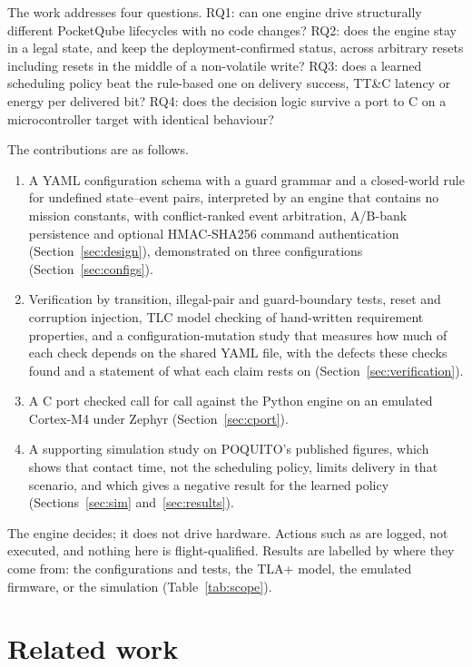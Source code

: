 \documentclass[preprint,12pt]{elsarticle}
\newcommand{\ttc}{TT\&C}
\begin{document}
The work addresses four questions. RQ1: can one engine drive structurally different PocketQube lifecycles with no code changes? RQ2: does the engine stay in a legal state, and keep the deployment-confirmed status, across arbitrary resets including resets in the middle of a non-volatile write? RQ3: does a learned scheduling policy beat the rule-based one on delivery success, \ttc{} latency or energy per delivered bit? RQ4: does the decision logic survive a port to C on a microcontroller target with identical behaviour?

The contributions are as follows.
\begin{enumerate}
\item A YAML configuration schema with a guard grammar and a closed-world rule for undefined state--event pairs, interpreted by an engine that contains no mission constants, with conflict-ranked event arbitration, A/B-bank persistence and optional HMAC-SHA256 command authentication (Section~\ref{sec:design}), demonstrated on three configurations (Section~\ref{sec:configs}).
\item Verification by transition, illegal-pair and guard-boundary tests, reset and corruption injection, TLC model checking of hand-written requirement properties, and a configuration-mutation study that measures how much of each check depends on the shared YAML file, with the defects these checks found and a statement of what each claim rests on (Section~\ref{sec:verification}).
\item A C port checked call for call against the Python engine on an emulated Cortex-M4 under Zephyr (Section~\ref{sec:cport}).
\item A supporting simulation study on POQUITO's published figures, which shows that contact time, not the scheduling policy, limits delivery in that scenario, and which gives a negative result for the learned policy (Sections~\ref{sec:sim} and~\ref{sec:results}).
\end{enumerate}

The engine decides; it does not drive hardware. Actions such as  are logged, not executed, and nothing here is flight-qualified. Results are labelled by where they come from: the configurations and tests, the TLA+ model, the emulated firmware, or the simulation (Table~\ref{tab:scope}).

\section{Related work}\label{sec:related}
\end{document}
